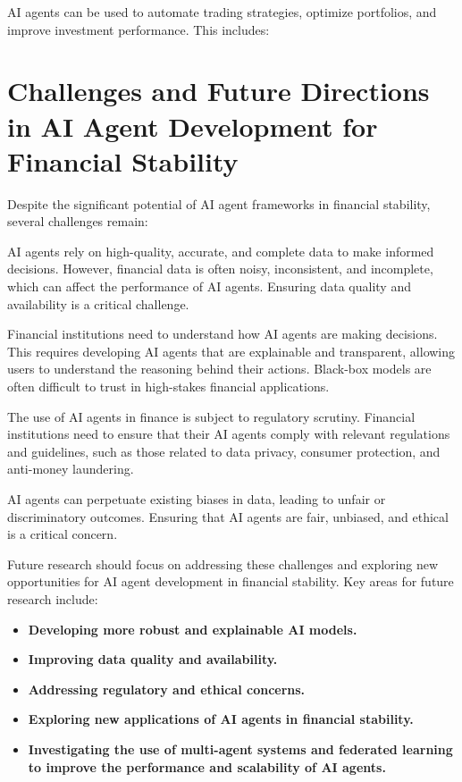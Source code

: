 \documentclass[a4paper,headinclude=on,footinclude=on,12pt,oneside]{scrbook}
\begin{document}

AI agents can be used to automate trading strategies, optimize portfolios, and improve investment performance. This includes:



\section*{Challenges and Future Directions in AI Agent Development for Financial Stability}

Despite the significant potential of AI agent frameworks in financial stability, several challenges remain:


AI agents rely on high-quality, accurate, and complete data to make informed decisions. However, financial data is often noisy, inconsistent, and incomplete, which can affect the performance of AI agents. Ensuring data quality and availability is a critical challenge.


Financial institutions need to understand how AI agents are making decisions. This requires developing AI agents that are explainable and transparent, allowing users to understand the reasoning behind their actions. Black-box models are often difficult to trust in high-stakes financial applications.


The use of AI agents in finance is subject to regulatory scrutiny. Financial institutions need to ensure that their AI agents comply with relevant regulations and guidelines, such as those related to data privacy, consumer protection, and anti-money laundering.


AI agents can perpetuate existing biases in data, leading to unfair or discriminatory outcomes. Ensuring that AI agents are fair, unbiased, and ethical is a critical concern.


Future research should focus on addressing these challenges and exploring new opportunities for AI agent development in financial stability. Key areas for future research include:

\begin{itemize}
\item \textbf{Developing more robust and explainable AI models.}
\item \textbf{Improving data quality and availability.}
\item \textbf{Addressing regulatory and ethical concerns.}
\item \textbf{Exploring new applications of AI agents in financial stability.}
\item \textbf{Investigating the use of multi-agent systems and federated learning to improve the performance and scalability of AI agents.}
\end{itemize}
\end{document}
